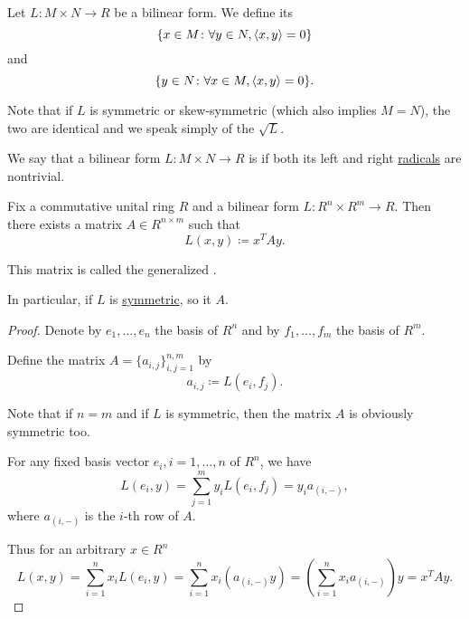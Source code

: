 \begin{definition}\label{def:bilinear_form_radicals}
  Let \( L: M \times N \to R \) be a bilinear form. We define its 
  \begin{equation*}
    \{ x \in M \colon \forall y \in N, \left\langle x, y \right\rangle = 0 \}
  \end{equation*}
  and 
  \begin{equation*}
    \{ y \in N \colon \forall x \in M, \left\langle x, y \right\rangle = 0 \}.
  \end{equation*}

  Note that if \( L \) is symmetric or skew-symmetric (which also implies \( M = N \)), the two are identical and we speak simply of the  \( \sqrt L \).
\end{definition}

\begin{definition}\label{def:nondegenerate_bilinear_form}
  We say that a bilinear form \( L: M \times N \to R \) is  if both its left and right \hyperref[def:bilinear_form_radicals]{radicals} are nontrivial.
\end{definition}

\begin{theorem}\label{thm:bilinear_form_matrix_presentation}
  Fix a commutative unital ring \( R \) and a bilinear form \( L: R^n \times R^m \to R \). Then there exists a matrix \( A \in R^{n \times m} \) such that
  \begin{equation*}
    L(x, y) \coloneqq x^T A y.
  \end{equation*}

  This matrix is called the generalized .

  In particular, if \( L \) is \hyperref[def:symmetric_function]{symmetric}, so it \( A \).
\end{theorem}
\begin{proof}
  Denote by \( e_1, \ldots, e_n \) the basis of \( R^n \) and by \( f_1, \ldots, f_m \) the basis of \( R^m \).

  Define the matrix \( A = \{ a_{i,j} \}_{i,j=1}^{n,m} \) by
  \begin{equation*}
    a_{i,j} \coloneqq L(e_i, f_j).
  \end{equation*}

  Note that if \( n = m \) and if \( L \) is symmetric, then the matrix \( A \) is obviously symmetric too.

  For any fixed basis vector \( e_i, i = 1, \ldots, n \) of \( R^n \), we have
  \begin{equation*}
    L(e_i, y)
    =
    \sum_{j=1}^m y_i L(e_i, f_j)
    =
    y_i a_{(i,-)},
  \end{equation*}
  where \( a_{(i,-)} \) is the \( i \)-th row of \( A \).

  Thus for an arbitrary \( x \in R^n \)
  \begin{equation*}
    L(x, y)
    =
    \sum_{i=1}^n x_i L(e_i, y)
    =
    \sum_{i=1}^n x_i (a_{(i,-)} y)
    =
    \left( \sum_{i=1}^n x_i a_{(i,-)} \right) y
    =
    x^T A y.
  \end{equation*}
\end{proof}

